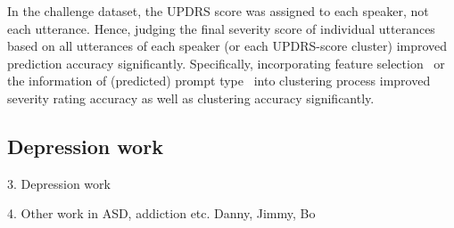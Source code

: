 \documentclass{article}
\begin{document}
In the challenge dataset, the UPDRS score was assigned to each speaker, not each utterance.
Hence, judging the final severity score of individual utterances based on all utterances of each speaker (or each UPDRS-score cluster) improved prediction accuracy significantly.
Specifically, incorporating feature selection~\cite{grosz2015assessing} or the information of (predicted) prompt type~\cite{kim2015automatic} into clustering process improved severity rating accuracy as well as clustering accuracy significantly.



\subsection{Depression work}

3. Depression work

4. Other work in ASD, addiction etc. 
Danny, Jimmy, Bo
\vfill\pagebreak



\end{document}
